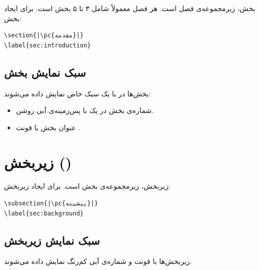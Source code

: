 بخش، زیرمجموعه‌ی فصل است. هر فصل معمولاً
شامل ۳ تا ۵ بخش است. برای ایجاد بخش:

\begin{latin}
\begin{verbatim}
\section{|\pc{مقدمه}|}
\label{sec:introduction}
\end{verbatim}
\end{latin}

\subsection{سبک نمایش بخش}
\label{sec:chapters-section-style}

بخش‌ها در  با یک سبک خاص نمایش
داده می‌شوند:

\begin{itemize}
    \item شماره‌ی بخش در یک 
    با پس‌زمینه‌ی آبی روشن.
    \item عنوان بخش با فونت \pnum{۱۵pt}.
\end{itemize}


\section{زیربخش ()}
\label{sec:chapters-subsection}

زیربخش، زیرمجموعه‌ی بخش است. برای ایجاد
زیربخش:

\begin{latin}
\begin{verbatim}
\subsection{|\pc{پیشینه}|}
\label{sec:background}
\end{verbatim}
\end{latin}

\subsection{سبک نمایش زیربخش}
\label{sec:chapters-subsection-style}

زیربخش‌ها با فونت \pnum{۱۳pt} و شماره‌ی آبی
کم‌رنگ نمایش داده می‌شوند.

